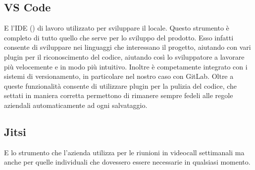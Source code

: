 \subsection*{VS Code}
E l'IDE () di lavoro utilizzato per sviluppare il locale. Questo strumento è completo di tutto quello che serve per lo sviluppo del prodotto.
Esso infatti consente di sviluppare nei linguaggi che interessano il progetto, aiutando con vari plugin per il riconoscimento del codice,
aiutando così lo sviluppatore a lavorare più velocemente e in modo più intuitivo. Inoltre è competamente integrato con i sistemi di
versionamento, in particolare nel nostro caso con GitLab. Oltre a queste funzionalità consente di utilizzare plugin per la pulizia del
codice, che settati in maniera corretta permettono di rimanere sempre fedeli alle regole aziendali automaticamente ad ogni salvataggio.

\subsection*{Jitsi}
E lo strumento che l'azienda utilizza per le riunioni in videocall settimanali ma anche per quelle individuali che dovessero essere necessarie
in qualsiasi momento.

